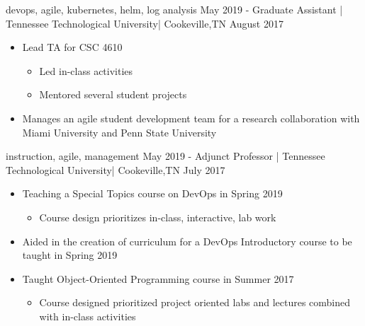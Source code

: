 \begin{experiences}
{\begin{itemize}
                        \end{itemize}
                    }
                    {devops, agile, kubernetes, helm, log analysis}
  \emptySeparator
  \experience
    {May 2019 -}   {Graduate Assistant | Tennessee Technological University}{| Cookeville,}{TN}
    {August 2017} {
                        \begin{itemize}
                            \item {Lead TA for CSC 4610}
                                \begin{itemize}
                                    \item {Led in-class activities}
                                    \item {Mentored several student projects}
                                \end{itemize}
                            \item {Manages an agile student development team for a research collaboration with Miami University and Penn State University}
                        \end{itemize}
                    }
                    {instruction, agile, management}
  \emptySeparator
  \experience
    {May 2019 -} {Adjunct Professor | Tennessee Technological University}{| Cookeville,}{TN}
    {July 2017}    {
                        \begin{itemize}
                            \item {Teaching a Special Topics course on DevOps in Spring 2019}
                            \begin{itemize}
                                \item {Course design prioritizes in-class, interactive, lab work}
                            \end{itemize}
                            \item {Aided in the creation of curriculum for a DevOps Introductory course to be taught in Spring 2019}
                            \item {Taught Object-Oriented Programming course in Summer 2017}
                            \begin{itemize}
                                \item {Course designed prioritized project oriented labs and lectures combined with in-class activities}
                            \end{itemize}
                      \end{itemize}
}
\end{experiences}
